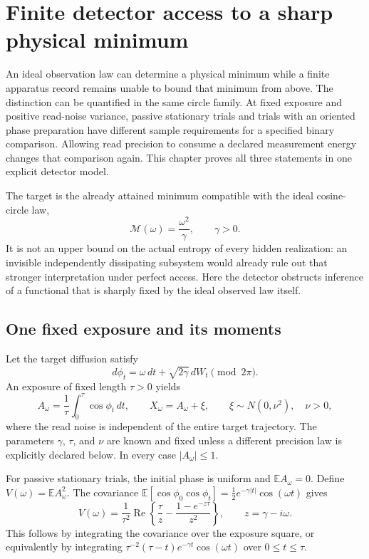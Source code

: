 \chapter{Finite detector access to a sharp physical minimum}
\label{ch:dg-finite-access}

An ideal observation law can determine a physical minimum while a finite
apparatus record remains unable to bound that minimum from above. The
distinction can be quantified in the same circle family. At fixed exposure
and positive read-noise variance, passive stationary trials and trials with
an oriented phase preparation have different sample requirements for a
specified binary comparison. Allowing read precision to consume a declared
measurement energy changes that comparison again. This chapter proves all
three statements in one explicit detector model.

The target is the already attained minimum compatible with the ideal
cosine-circle law,
\begin{equation}
 \mathcal M(\omega)=\frac{\omega^2}{\gamma},\qquad \gamma>0.
 \label{eq:dg-minimum-target}
\end{equation}
It is not an upper bound on the actual entropy of every hidden realization:
an invisible independently dissipating subsystem would already rule out
that stronger interpretation under perfect access. Here the detector
obstructs inference of a functional that is sharply fixed by the ideal
observed law itself.

\section{One fixed exposure and its moments}

Let the target diffusion satisfy
\[
 d\phi_t=\omega\,dt+\sqrt{2\gamma}\,dW_t\pmod{2\pi}.
\]
An exposure of fixed length $\tau>0$ yields
\begin{equation}
 A_\omega=\frac1\tau\int_0^\tau\cos\phi_t\,dt,
 \qquad X_\omega=A_\omega+\xi,
 \qquad \xi\sim N(0,\nu^2),\quad\nu>0,
 \label{eq:dg-exposure-record}
\end{equation}
where the read noise is independent of the entire target trajectory.
The parameters $\gamma$, $\tau$, and $\nu$ are known and fixed unless a
different precision law is explicitly declared below. In every case
$|A_\omega|\leq1$.

For passive stationary trials, the initial phase is uniform and
$\mathbb E A_\omega=0$. Define $V(\omega)=\mathbb E A_\omega^2$.
The covariance
$\mathbb E[\cos\phi_0\cos\phi_t]
 =\tfrac12e^{-\gamma|t|}\cos(\omega t)$ gives
\begin{equation}
 V(\omega)=\frac1{\tau^2}\operatorname{Re}
 \left\{\frac\tau z-\frac{1-e^{-z\tau}}{z^2}\right\},
 \qquad z=\gamma-i\omega.
 \label{eq:dg-exposure-variance}
\end{equation}
This follows by integrating the covariance over the exposure square, or
equivalently by integrating
$\tau^{-2}(\tau-t)e^{-\gamma t}\cos(\omega t)$ over $0\leq t\leq\tau$.


